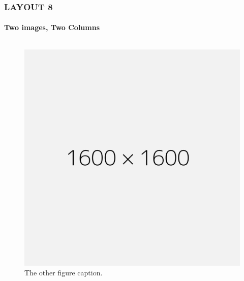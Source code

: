 \documentclass[14 pt]{beamer}
\begin{document}
\begin{frame}[t]
\frametitle{LAYOUT 8}
\framesubtitle{Two images, Two Columns}

\begin{columns}[t]
  \begin{column}{0.45\textwidth}
    \begin{figure}[t]
      \includegraphics[width=1\textwidth]{img/1600x1600.png}
      \caption{The other figure caption.}
    \end{figure}
  \end{column}


\end{columns}
\end{frame}
\end{document}
